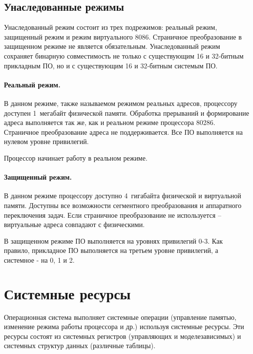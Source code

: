 \subsection{Унаследованные режимы}
Унаследованный режим состоит из трех подрежимов: реальный режим, защищенный режим и режим виртуального 8086.
Страничное преобразование в защищенном режиме не является обязательным. Унаследованный режим сохраняет
бинарную совместимость не только с существующим 16 и 32-битным прикладным ПО, но и с существующим 16 и 32-битным
системым ПО.

\paragraph{Реальный режим.}
В данном режиме, также называемом режимом реальных адресов, процессору доступен 1~мегабайт физической памяти.
Обработка прерываний и формирование адреса выполняется так же, как и реальном режиме процессора 80286.
Страничное преобразование адреса не поддерживается. Все ПО выполняется на нулевом уровне привилегий.

Процессор начинает работу в реальном режиме.

\paragraph{Защищенный режим.}
В данном режиме процессору доступно 4~гигабайта физической и виртуальной памяти. Доступны все возможности
сегментного преобразования и аппаратного переключения задач. Если страничное преобразование не используется --
виртуальные адреса совпадают с физическими.

В защищенном режиме ПО выполняется на уровнях привилегий 0-3. Как правило, прикладное ПО выполняется на третьем
уровне привилегий, а системное - на 0, 1 и 2.


\section{Системные ресурсы}
Операционная система выполняет системные операции (управление памятью, изменение режима работы процессора и др.)
используя системные ресурсы. Эти ресурсы состоят из системных регистров (управляющих и моделезависимых)
и системных структур данных (различные таблицы).

